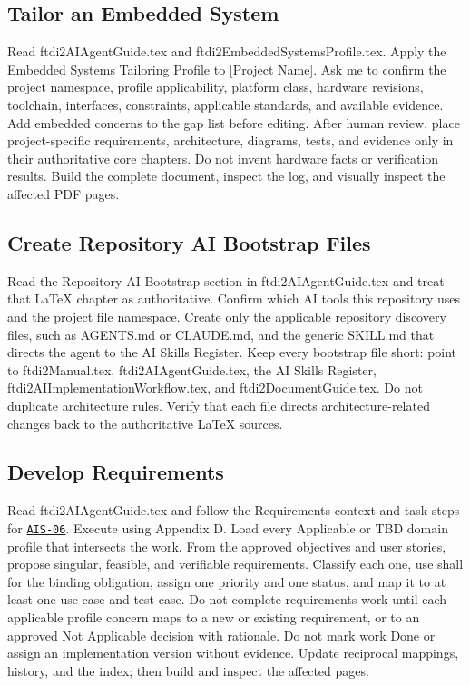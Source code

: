\subsection{Tailor an Embedded System}
\begingroup\ttfamily\raggedright
\noindent Read ftdi2AIAgentGuide.tex and ftdi2EmbeddedSystemsProfile.tex. Apply the Embedded Systems Tailoring Profile to [Project Name]. Ask me to confirm the project namespace, profile applicability, platform class, hardware revisions, toolchain, interfaces, constraints, applicable standards, and available evidence. Add embedded concerns to the gap list before editing. After human review, place project-specific requirements, architecture, diagrams, tests, and evidence only in their authoritative core chapters. Do not invent hardware facts or verification results. Build the complete document, inspect the log, and visually inspect the affected PDF pages.\par
\endgroup


\subsection{Create Repository AI Bootstrap Files}
\begingroup\ttfamily\raggedright
\noindent Read the Repository AI Bootstrap section in ftdi2AIAgentGuide.tex and treat that LaTeX chapter as authoritative. Confirm which AI tools this repository uses and the project file namespace. Create only the applicable repository discovery files, such as AGENTS.md or CLAUDE.md, and the generic SKILL.md that directs the agent to the AI Skills Register. Keep every bootstrap file short: point to ftdi2Manual.tex, ftdi2AIAgentGuide.tex, the AI Skills Register, ftdi2AIImplementationWorkflow.tex, and ftdi2DocumentGuide.tex. Do not duplicate architecture rules. Verify that each file directs architecture-related changes back to the authoritative LaTeX sources.\par
\endgroup


\subsection{Develop Requirements}
\begingroup\ttfamily\raggedright
\noindent Read ftdi2AIAgentGuide.tex and follow the Requirements context and task steps for \hyperref[Skill:AIS-06]{\texttt{AIS-06}}. Execute using Appendix D. Load every Applicable or TBD domain profile that intersects the work. From the approved objectives and user stories, propose singular, feasible, and verifiable requirements. Classify each one, use shall for the binding obligation, assign one priority and one status, and map it to at least one use case and test case. Do not complete requirements work until each applicable profile concern maps to a new or existing requirement, or to an approved Not Applicable decision with rationale. Do not mark work Done or assign an implementation version without evidence. Update reciprocal mappings, history, and the index; then build and inspect the affected pages.\par
\endgroup


